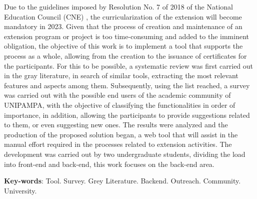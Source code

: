\begin{resumo}[Abstract]
 Due to the guidelines imposed by Resolution No. 7 of 2018 of the National Education Council (CNE) \cite{Resolucao-MEC:2018}, the curricularization of the extension will become mandatory in 2023. Given that the process of creation and maintenance of an extension program or project is too time-consuming and added to the imminent obligation, the objective of this work is to implement a tool that supports the process as a whole, allowing from the creation to the issuance of certificates for the participants. For this to be possible, a systematic review was first carried out in the gray literature, in search of similar tools, extracting the most relevant features and aspects among them. Subsequently, using the list reached, a survey was carried out with the possible end users of the academic community of UNIPAMPA, with the objective of classifying the functionalities in order of importance, in addition, allowing the participants to provide suggestions related to them, or even suggesting new ones. The results were analyzed and the production of the proposed solution began, a web tool that will assist in the manual effort required in the processes related to extension activities. The development was carried out by two undergraduate students, dividing the load into front-end and back-end, this work focuses on the back-end area.

 \vspace{\onelineskip}
 
 \noindent 
 \textbf{Key-words}: Tool. Survey. Grey Literature. Backend. Outreach. Community. University.
\end{resumo}
